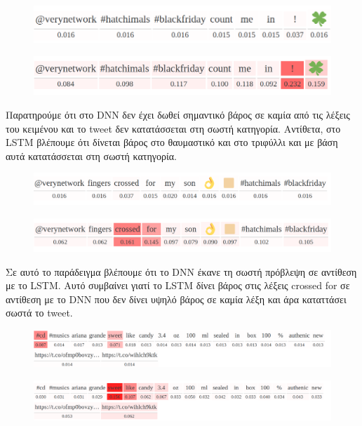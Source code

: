\documentclass[12pt]{article}
\begin{document}
\begin{figure}[h!]
	\centering
		\includegraphics[width=0.9\linewidth]{473_DNN.png}
	\label{fig:sin}
\end{figure}
\begin{figure}[h!]
	\centering
		\includegraphics[width=0.9\linewidth]{473_LSTM.png}
	\label{fig:sin}
\end{figure}

Παρατηρούμε ότι στο DNN δεν έχει δωθεί σημαντικό βάρος σε καμία από τις λέξεις του κειμένου και το tweet δεν κατατάσσεται στη σωστή κατηγορία. Αντίθετα, στο LSTM βλέπουμε ότι δίνεται βάρος στο θαυμαστικό και στο τριφύλλι και με βάση αυτά κατατάσσεται στη σωστή κατηγορία.  

\begin{figure}[h!]
	\centering
		\includegraphics[width=0.9\linewidth]{500_DNN.png}
	\label{fig:sin}
\end{figure}
\begin{figure}[h!]
	\centering
		\includegraphics[width=0.9\linewidth]{500_LSTM.png}
	\label{fig:sin}
\end{figure}


Σε αυτό το παράδειγμα βλέπουμε ότι το DNN έκανε τη σωστή πρόβλεψη σε αντίθεση με το LSTM. Αυτό συμβαίνει γιατί το LSTM δίνει βάρος στις λέξεις crossed for σε αντίθεση με το DNN που δεν δίνει υψηλό βάρος σε καμία λέξη και άρα καταττάσει σωστά το tweet.

\begin{figure}[h!]
	\centering
		\includegraphics[width=0.9\linewidth]{3_DNN.png}
	\label{fig:sin}
\end{figure}
\begin{figure}[h!]
	\centering
		\includegraphics[width=0.9\linewidth]{3_LSTM.png}
	\label{fig:sin}
\end{figure}
\end{document}
